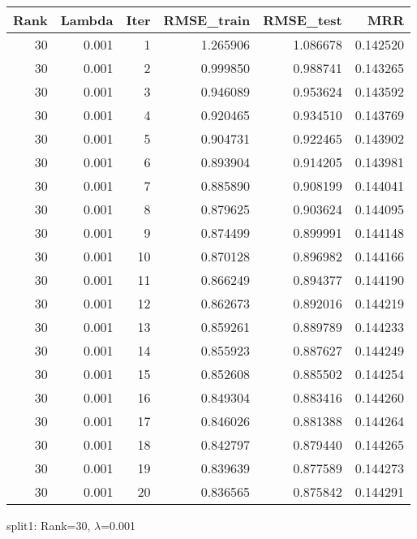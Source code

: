 \begin{tabular}{rrrrrr}
\toprule
 Rank &  Lambda &  Iter &  RMSE\_train &  RMSE\_test &       MRR \\
\midrule
   30 &   0.001 &     1 &    1.265906 &   1.086678 &  0.142520 \\
   30 &   0.001 &     2 &    0.999850 &   0.988741 &  0.143265 \\
   30 &   0.001 &     3 &    0.946089 &   0.953624 &  0.143592 \\
   30 &   0.001 &     4 &    0.920465 &   0.934510 &  0.143769 \\
   30 &   0.001 &     5 &    0.904731 &   0.922465 &  0.143902 \\
   30 &   0.001 &     6 &    0.893904 &   0.914205 &  0.143981 \\
   30 &   0.001 &     7 &    0.885890 &   0.908199 &  0.144041 \\
   30 &   0.001 &     8 &    0.879625 &   0.903624 &  0.144095 \\
   30 &   0.001 &     9 &    0.874499 &   0.899991 &  0.144148 \\
   30 &   0.001 &    10 &    0.870128 &   0.896982 &  0.144166 \\
   30 &   0.001 &    11 &    0.866249 &   0.894377 &  0.144190 \\
   30 &   0.001 &    12 &    0.862673 &   0.892016 &  0.144219 \\
   30 &   0.001 &    13 &    0.859261 &   0.889789 &  0.144233 \\
   30 &   0.001 &    14 &    0.855923 &   0.887627 &  0.144249 \\
   30 &   0.001 &    15 &    0.852608 &   0.885502 &  0.144254 \\
   30 &   0.001 &    16 &    0.849304 &   0.883416 &  0.144260 \\
   30 &   0.001 &    17 &    0.846026 &   0.881388 &  0.144264 \\
   30 &   0.001 &    18 &    0.842797 &   0.879440 &  0.144265 \\
   30 &   0.001 &    19 &    0.839639 &   0.877589 &  0.144273 \\
   30 &   0.001 &    20 &    0.836565 &   0.875842 &  0.144291 \\
\bottomrule
\end{tabular}

\caption{split1: Rank=30, $\lambda$=0.001}
